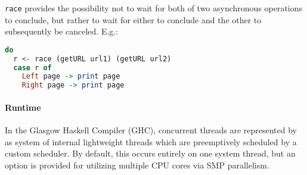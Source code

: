\documentclass[a4paper,UKenglish,cleveref, autoref, thm-restate]{lipics-v2021}
\begin{document}
\lstinline{race} provides the possibility not to wait for both of two asynchronous operations to conclude, but rather to wait for either to conclude and the other to subsequently be canceled. E.g.:

\begin{minipage}{\linewidth}
\begin{lstlisting}[language=Haskell,caption={Racing two fetches and printing whichever responds first},captionpos=t]
do
  r <- race (getURL url1) (getURL url2)
  case r of
    Left page -> print page
    Right page -> print page
\end{lstlisting}
\end{minipage}

\paragraph*{Runtime}

In the Glasgow Haskell Compiler (GHC), concurrent threads are represented by as system of internal lightweight threads which are preemptively scheduled by a custom scheduler\cite{schedule78:online}. By default, this occurs entirely on one system thread, but an option is provided for utilizing multiple CPU cores via SMP parallelism\cite{54UsingC70:online}.

%
%




\appendix
\end{document}

